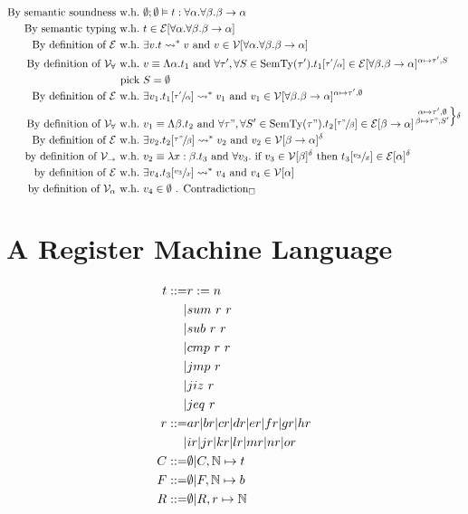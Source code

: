 \documentclass{article}
\begin{document}
\begin{align*}
    \text{By semantic soundness w.h.} &\ \emptyset;\emptyset\vDash t: \forall\alpha.\forall\beta.\beta\to\alpha \\
    \text{By semantic typing w.h.} &\ t\in\mathcal{E}[\forall\alpha.\forall\beta.\beta\to\alpha] \\
    \text{By definition of $\mathcal{E}$ w.h.} &\ \exists v. t\leadsto^{*} v \text{ and } v \in \mathcal{V}[\forall\alpha.\forall\beta.\beta\to\alpha] \\
    \text{By definition of $\mathcal{V}_\forall$ w.h.} &\ v\equiv \Lambda \alpha.t_1\text{ and } \forall\tau',\forall S\in\text{SemTy}(\tau'). t_1[\sfrac{\tau'}\alpha] \in \mathcal{E}[\forall\beta.\beta\to\alpha]^{\alpha\mapsto \tau',S} \\
    \text{pick} &\ S=\emptyset \\
    \text{By definition of $\mathcal{E}$ w.h.} &\ \exists v_1. t_1[\sfrac{\tau'}\alpha] \leadsto^{*} v_1 \text{ and } v_1\in\mathcal{V}[\forall\beta.\beta\to\alpha]^{\alpha\mapsto \tau',\emptyset} \\
    \text{By definition of $\mathcal{V}_\forall$ w.h.} &\ v_1\equiv \Lambda \beta.t_2\text{ and } \forall\tau",\forall S'\in\text{SemTy}(\tau"). t_2[\sfrac{\tau"}\beta] \in \mathcal{E}[\beta\to\alpha]^{\left.\substack{\alpha\mapsto \tau',\emptyset\\\beta\mapsto \tau",S'}\right\}\delta} \\
    \text{By definition of $\mathcal{E}$ w.h.} &\ \exists v_2.t_2[\sfrac{\tau"}\beta]\leadsto^{*} v_2 \text{ and } v_2\in\mathcal{V}[\beta\to\alpha]^{\delta} \\
    \text{by definition of $\mathcal{V}_\to$ w.h.} &\ v_2 \equiv \lambda x:\beta.t_3 \text{ and } \forall v_3.\text{ if } v_3 \in\mathcal{V}[\beta]^\delta \text{ then } t_3[\sfrac{v_3}x]\in\mathcal{E}[\alpha]^\delta \\
    \text{by definition of $\mathcal{E}$ w.h.} &\ \exists v_4. t_3[\sfrac{v_3}x]\leadsto^{*} v_4\text{ and } v_4\in\mathcal{V}[\alpha] \\
    \text{by definition of $\mathcal{V}_\alpha$ w.h.} &\ v_4\in\emptyset\text{ . Contradiction}_\square
\end{align*}

\newpage
\section{A Register Machine Language}
\begin{align*}
    t ::= & r:=n \\
        |& sum\ r\ r \\
        |& sub\ r\ r \\
        |& cmp\ r\ r \\
        |& jmp\ r \\
        |& jiz\ r \\
        |& jeq\ r \\
    r ::= & ar|br|cr|dr|er|fr|gr|hr \\
        |&ir|jr|kr|lr|mr|nr|or \\
    C ::=& \emptyset | C,\N\mapsto t \\
    F ::=& \emptyset | F,\N\mapsto b \\
    R ::=& \emptyset | R, r\mapsto \N \\
\end{align*}
\end{document}
